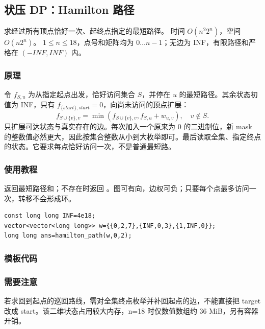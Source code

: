 \subsection{状压 DP：Hamilton 路径}
\label{dp:hamilton}
\AlgorithmInfo
    {求经过所有顶点恰好一次、起终点指定的最短路径。}
    {时间 $O(n^2 2^n)$，空间 $O(n2^n)$。}
    {$1\le n\le18$，点号和矩阵均为 $0\ldots n-1$；无边为 INF，有限路径和严格在 $(-INF,INF)$ 内。}
\subsubsection*{原理}

令 $f_{S,u}$ 为从指定起点出发，恰好访问集合 $S$，并停在 $u$ 的最短路径。其余状态初值为 INF，只有 $f_{\{start\},start}=0$，向尚未访问的顶点扩展：
\[
 f_{S\cup\{v\},v}=\min(f_{S\cup\{v\},v},f_{S,u}+w_{u,v}),\quad v\notin S.
\]
只扩展可达状态与真实存在的边。每次加入一个原来为 0 的二进制位，新 mask 的整数值必然更大，因此按集合整数从小到大枚举即可。最后读取全集、指定终点的状态。它要求每点恰好访问一次，不是普通最短路。

\subsubsection*{使用教程}
 返回最短路径和；不存在时返回 。图可有向，边权可负；只要每个点最多访问一次，转移不会形成环。
\begin{lstlisting}[style=mtycpp,numbers=none]
const long long INF=4e18;
vector<vector<long long>> w={{0,2,7},{INF,0,3},{1,INF,0}};
long long ans=hamilton_path(w,0,2);
\end{lstlisting}
\subsubsection*{模板代码}
\subsubsection*{需要注意}
若求回到起点的巡回路线，需对全集终点枚举并补回起点的边，不能直接把 target 改成 start。该二维状态占用较大内存，n=18 时仅数值数组约 36 MiB，另有容器开销。
